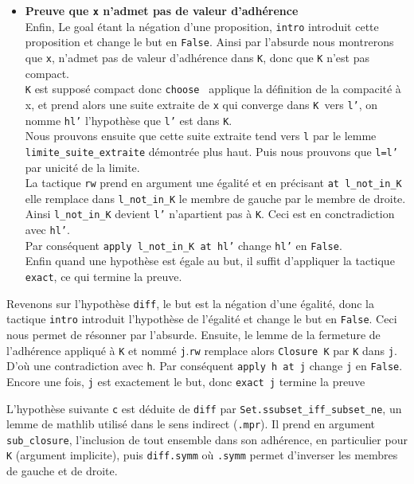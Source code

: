 \documentclass[a4paper, 12pt]{article}
\newcommand{\lean}[1]{\texttt{#1}}
\begin{document}
\begin{itemize}[itemsep=30pt]
    \item  \textbf{ Preuve que \lean{x} n'admet pas de valeur d'adhérence}\\
    Enfin, Le goal étant la négation d'une proposition, \lean{intro} introduit cette proposition et change le but en \lean{False}. Ainsi par l'absurde nous montrerons que \lean{x}, 
    n'admet pas de valeur d'adhérence dans \lean{K}, donc que \lean{K} n'est pas compact. \\
    \lean{K} est supposé compact donc \lean{choose } applique la définition de la compacité à x, et prend alors une suite extraite de \lean{x} qui converge dans \lean{K }vers \lean{l'},
    on nomme \lean{hl'} l'hypothèse que \lean{l'} est dans \lean{K}.\\
    Nous prouvons ensuite que cette suite extraite tend vers \lean{l} par le lemme \lean{limite_suite_extraite} démontrée plus haut. Puis nous prouvons que \lean{l=l'} par unicité de la
    limite.\\ 
    La tactique \lean{rw} prend en argument une égalité et en précisant \lean{at l_not_in_K } elle remplace dans \lean{l_not_in_K} le membre de gauche par le membre de droite. Ainsi
    \lean{l_not_in_K} devient \lean{l'} n'apartient pas à \lean{K}. Ceci est en conctradiction avec \lean{hl'}.\\ 
    Par conséquent \lean{apply l_not_in_K at hl'} change \lean{hl'} en \lean{False}.\\
    Enfin quand une hypothèse est égale au but, il suffit d'appliquer la tactique \lean{exact}, ce qui termine la preuve.

\end{itemize}

\vspace{\baselineskip}
Revenons sur l'hypothèse \lean{diff}, le but est la négation d'une égalité, donc la tactique \lean{intro} introduit l'hypothèse de l'égalité et change le but en \lean{False}. Ceci nous permet de résonner par l'absurde. Ensuite, le lemme de la fermeture de l'adhérence appliqué à \lean{K} et nommé \lean{j}.\lean{rw} remplace alors \lean{Closure K} par \lean{K} dans \lean{j}. D'où une contradiction avec \lean{h}. Par conséquent \lean{apply h at j} change \lean{j} en \lean{False}. Encore une fois, \lean{j} est exactement le but, donc \lean{exact j} termine la preuve

L'hypothèse suivante \lean{c} est déduite de \lean{diff} par \lean{Set.ssubset_iff_subset_ne}, un lemme de mathlib utilisé dans le sens indirect (\lean{.mpr}). Il prend en argument \lean{sub_closure}, l'inclusion de tout ensemble dans son adhérence, en particulier pour \lean{K} (argument implicite), puis \lean{diff.symm} où \lean{.symm} permet d'inverser les membres de gauche et de droite.
\end{document}
